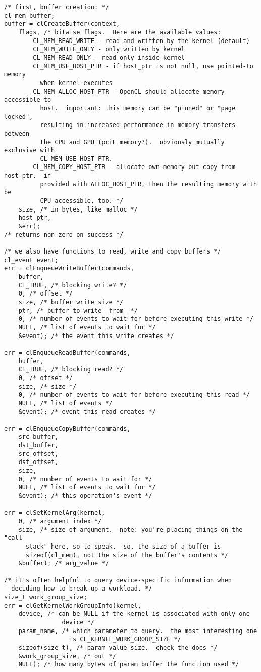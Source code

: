 \documentclass{article}
\begin{document}
\begin{verbatim}
/* first, buffer creation: */
cl_mem buffer;
buffer = clCreateBuffer(context,
    flags, /* bitwise flags.  Here are the available values:
        CL_MEM_READ_WRITE - read and written by the kernel (default)
        CL_MEM_WRITE_ONLY - only written by kernel
        CL_MEM_READ_ONLY - read-only inside kernel
        CL_MEM_USE_HOST_PTR - if host_ptr is not null, use pointed-to memory
          when kernel executes
        CL_MEM_ALLOC_HOST_PTR - OpenCL should allocate memory accessible to
          host.  important: this memory can be "pinned" or "page locked", 
          resulting in increased performance in memory transfers between
          the CPU and GPU (pciE memory?).  obviously mutually exclusive with 
          CL_MEM_USE_HOST_PTR.
        CL_MEM_COPY_HOST_PTR - allocate own memory but copy from host_ptr.  if
          provided with ALLOC_HOST_PTR, then the resulting memory with be
          CPU accessible, too. */
    size, /* in bytes, like malloc */
    host_ptr,
    &err);
/* returns non-zero on success */

/* we also have functions to read, write and copy buffers */
cl_event event;
err = clEnqueueWriteBuffer(commands,
    buffer,
    CL_TRUE, /* blocking write? */
    0, /* offset */
    size, /* buffer write size */
    ptr, /* buffer to write _from_ */
    0, /* number of events to wait for before executing this write */
    NULL, /* list of events to wait for */
    &event); /* the event this write creates */

err = clEnqueueReadBuffer(commands,
    buffer,
    CL_TRUE, /* blocking read? */
    0, /* offset */
    size, /* size */
    0, /* number of events to wait for before executing this read */
    NULL, /* list of events */
    &event); /* event this read creates */

err = clEnqueueCopyBuffer(commands,
    src_buffer,
    dst_buffer,
    src_offset,
    dst_offset,
    size,
    0, /* number of events to wait for */
    NULL, /* list of events to wait for */
    &event); /* this operation's event */ 

err = clSetKernelArg(kernel,
    0, /* argument index */
    size, /* size of argument.  note: you're placing things on the "call 
      stack" here, so to speak.  so, the size of a buffer is 
      sizeof(cl_mem), not the size of the buffer's contents */
    &buffer); /* arg_value */

/* it's often helpful to query device-specific information when 
  deciding how to break up a workload. */
size_t work_group_size;
err = clGetKernelWorkGroupInfo(kernel,
    device, /* can be NULL if the kernel is associated with only one 
                device */
    param_name, /* which parameter to query.  the most interesting one
                  is CL_KERNEL_WORK_GROUP_SIZE */
    sizeof(size_t), /* param_value_size.  check the docs */
    &work_group_size, /* out */
    NULL); /* how many bytes of param buffer the function used */


\end{verbatim}
\end{document}
